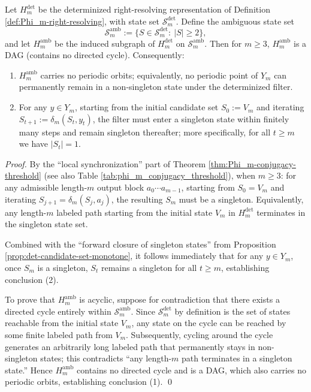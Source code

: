 \begin{theorem}\label{thm:Ym-ambiguity-shell-dag}
Let $H_m^{\mathrm{det}}$ be the determinized right-resolving representation of Definition \ref{def:Phi_m-right-resolving}, with state set $\mathcal{S}_m^{\mathrm{det}}$. Define the ambiguous state set
\[
\mathcal{S}_m^{\mathrm{amb}}:=\{S\in\mathcal{S}_m^{\mathrm{det}}:\ |S|\ge 2\},
\]
and let $H_m^{\mathrm{amb}}$ be the induced subgraph of $H_m^{\mathrm{det}}$ on $\mathcal{S}_m^{\mathrm{amb}}$.
Then for $m\ge 3$, $H_m^{\mathrm{amb}}$ is a DAG (contains no directed cycle). Consequently:
\begin{enumerate}
  \item $H_m^{\mathrm{amb}}$ carries no periodic orbits; equivalently, no periodic point of $Y_m$ can permanently remain in a non-singleton state under the determinized filter.
  \item For any $y\in Y_m$, starting from the initial candidate set $S_0:=V_m$ and iterating $S_{t+1}:=\delta_m(S_t,y_t)$, the filter must enter a singleton state within finitely many steps and remain singleton thereafter; more specifically, for all $t\ge m$ we have $|S_t|=1$.
\end{enumerate}
\end{theorem}
\begin{proof}
By the ``local synchronization'' part of Theorem \ref{thm:Phi_m-conjugacy-threshold} (see also Table \ref{tab:phi_m_conjugacy_threshold}), when $m\ge 3$: for any admissible length-$m$ output block $a_0\cdots a_{m-1}$, starting from $S_0=V_m$ and iterating $S_{j+1}=\delta_m(S_j,a_j)$, the resulting $S_m$ must be a singleton. Equivalently, any length-$m$ labeled path starting from the initial state $V_m$ in $H_m^{\mathrm{det}}$ terminates in the singleton state set.

Combined with the ``forward closure of singleton states'' from Proposition \ref{prop:det-candidate-set-monotone}, it follows immediately that for any $y\in Y_m$, once $S_m$ is a singleton, $S_t$ remains a singleton for all $t\ge m$, establishing conclusion (2).

To prove that $H_m^{\mathrm{amb}}$ is acyclic, suppose for contradiction that there exists a directed cycle entirely within $\mathcal{S}_m^{\mathrm{amb}}$. Since $\mathcal{S}_m^{\mathrm{det}}$ by definition is the set of states reachable from the initial state $V_m$, any state on the cycle can be reached by some finite labeled path from $V_m$. Subsequently, cycling around the cycle generates an arbitrarily long labeled path that permanently stays in non-singleton states; this contradicts ``any length-$m$ path terminates in a singleton state.'' Hence $H_m^{\mathrm{amb}}$ contains no directed cycle and is a DAG, which also carries no periodic orbits, establishing conclusion (1). \qed
\end{proof}

